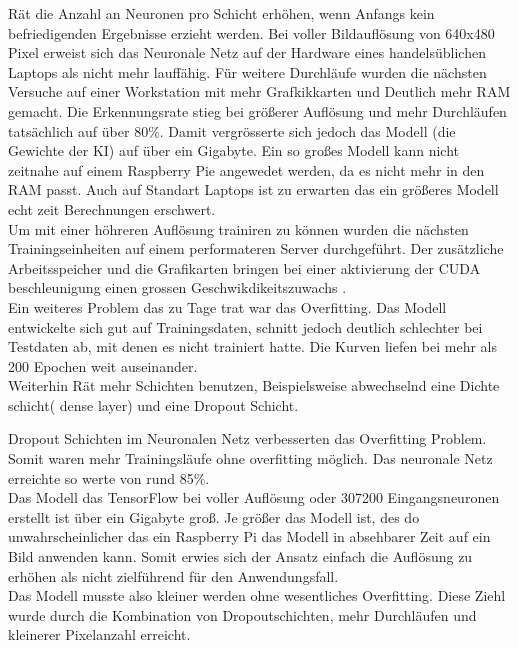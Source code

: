 \documentclass[conference]{IEEEtran}
\begin{document}
\cite{b3} Rät die Anzahl an Neuronen pro Schicht erhöhen, wenn Anfangs kein befriedigenden Ergebnisse erzieht werden.
Bei voller Bildauflösung von 640x480 Pixel erweist sich das Neuronale Netz auf der Hardware eines handelsüblichen Laptops als nicht mehr lauffähig. Für weitere Durchläufe wurden die nächsten Versuche auf einer Workstation mit mehr Grafkikkarten und Deutlich mehr RAM gemacht. Die Erkennungsrate stieg bei größerer Auflösung und mehr Durchläufen tatsächlich auf über 80\%. Damit vergrösserte sich jedoch das Modell (die Gewichte der KI) auf über ein Gigabyte. Ein so großes Modell kann nicht zeitnahe auf einem Raspberry Pie angewedet werden, da es nicht mehr in den RAM passt. Auch auf Standart Laptops ist zu erwarten das ein größeres Modell echt zeit Berechnungen erschwert. \\


Um mit einer höhreren Auflösung trainiren zu können wurden die nächsten Trainingseinheiten auf einem performateren Server durchgeführt. Der zusätzliche Arbeitsspeicher und die Grafikarten bringen bei einer aktivierung der CUDA beschleunigung einen grossen Geschwikdikeitszuwachs . \\

Ein weiteres Problem das zu Tage trat war das Overfitting. Das Modell entwickelte sich gut auf Trainingsdaten, schnitt jedoch deutlich schlechter bei Testdaten ab, mit denen es nicht trainiert hatte. Die Kurven liefen bei mehr als 200 Epochen weit auseinander.\\


Weiterhin Rät \cite{b3} mehr Schichten benutzen, Beispielsweise abwechselnd eine Dichte schicht( dense layer) und eine Dropout Schicht.

Dropout Schichten im Neuronalen Netz verbesserten das Overfitting Problem. Somit waren mehr Trainingsläufe ohne overfitting möglich. Das neuronale Netz erreichte so werte von rund 85\%. \\

Das Modell das TensorFlow bei voller Auflösung oder 307200 Eingangsneuronen erstellt ist über ein Gigabyte groß. Je größer das Modell ist, des do unwahrscheinlicher das ein Raspberry Pi das Modell in absehbarer Zeit auf ein Bild anwenden kann. Somit erwies sich der Ansatz einfach die Auflösung zu erhöhen als nicht  zielführend für den Anwendungsfall. \\

Das Modell musste also kleiner werden ohne wesentliches Overfitting. Diese Ziehl wurde durch die Kombination von Dropoutschichten, mehr Durchläufen und kleinerer Pixelanzahl erreicht. \\
\end{document}
